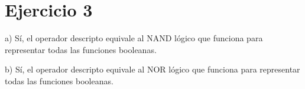 \section*{Ejercicio 3}

a) Sí, el operador descripto equivale al NAND lógico que funciona para representar todas las funciones booleanas.

b) Sí, el operador descripto equivale al NOR lógico que funciona para representar todas las funciones booleanas.
